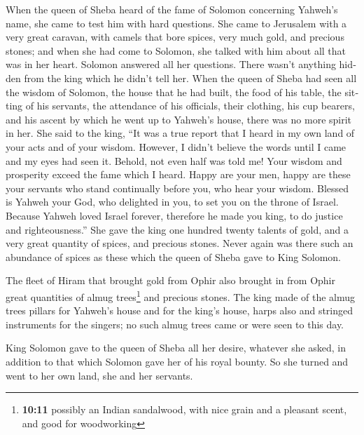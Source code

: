 \begin{paracol}{2}
\begin{otherlanguage}{english}
 When the queen of Sheba heard of the fame of Solomon
concerning Yahweh's name, she came to test him with hard questions.
 She came to Jerusalem with a very great caravan, with
camels that bore spices, very much gold, and precious stones; and when
she had come to Solomon, she talked with him about all that was in her
heart.  Solomon answered all her questions. There wasn't
anything hidden from the king which he didn't tell her. 
When the queen of Sheba had seen all the wisdom of Solomon, the house
that he had built,  the food of his table, the sitting of
his servants, the attendance of his officials, their clothing, his cup
bearers, and his ascent by which he went up to Yahweh's house, there was
no more spirit in her.  She said to the king, ``It was a
true report that I heard in my own land of your acts and of your wisdom.
 However, I didn't believe the words until I came and my
eyes had seen it. Behold, not even half was told me! Your wisdom and
prosperity exceed the fame which I heard.  Happy are your
men, happy are these your servants who stand continually before you, who
hear your wisdom.  Blessed is Yahweh your God, who
delighted in you, to set you on the throne of Israel. Because Yahweh
loved Israel forever, therefore he made you king, to do justice and
righteousness.''  She gave the king one hundred twenty
talents of gold, and a very great quantity of spices, and precious
stones. Never again was there such an abundance of spices as these which
the queen of Sheba gave to King Solomon.

 The fleet of Hiram that brought gold from Ophir also
brought in from Ophir great quantities of almug trees\footnote{\textbf{10:11}
  possibly an Indian sandalwood, with nice grain and a pleasant scent,
  and good for woodworking} and precious stones.  The
king made of the almug trees pillars for Yahweh's house and for the
king's house, harps also and stringed instruments for the singers; no
such almug trees came or were seen to this day.

 King Solomon gave to the queen of Sheba all her desire,
whatever she asked, in addition to that which Solomon gave her of his
royal bounty. So she turned and went to her own land, she and her
servants.


\end{otherlanguage}
\end{paracol}
